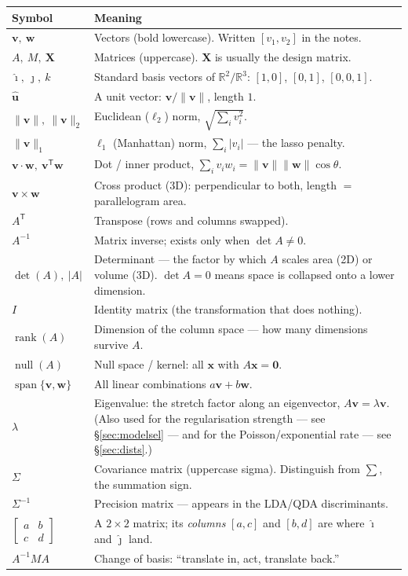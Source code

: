 \documentclass[10pt,letterpaper,onecolumn]{article}
\makeatletter
\newenvironment{symtab}
  {\begin{longtable}{@{}>{\raggedright\arraybackslash}p{0.26\textwidth}%
                       >{\raggedright\arraybackslash}p{0.70\textwidth}@{}}
   \toprule
   \textbf{Symbol} & \textbf{Meaning} \\
   \midrule
   \endhead
   \bottomrule
   \endfoot}
  {\end{longtable}}
\newcommand{\T}{\mathsf{T}}
\makeatother
\begin{document}
\begin{symtab}
$\mathbf{v},\ \mathbf{w}$ & Vectors (bold lowercase). Written $[v_1, v_2]$ in the notes. \\
$A,\ M,\ \mathbf{X}$ & Matrices (uppercase). $\mathbf{X}$ is usually the design matrix. \\
$\hat{\imath},\ \hat{\jmath},\ \hat{k}$ & Standard basis vectors of $\mathbb{R}^2 / \mathbb{R}^3$: $[1,0]$, $[0,1]$, $[0,0,1]$. \\
$\hat{\mathbf{u}}$ & A unit vector: $\mathbf{v}/\|\mathbf{v}\|$, length $1$. \\
$\|\mathbf{v}\|,\ \|\mathbf{v}\|_2$ & Euclidean ($\ell_2$) norm, $\sqrt{\textstyle\sum_i v_i^2}$. \\
$\|\mathbf{v}\|_1$ & $\ell_1$ (Manhattan) norm, $\sum_i |v_i|$ — the lasso penalty. \\
$\mathbf{v}\cdot\mathbf{w},\ \mathbf{v}^{\T}\mathbf{w}$ & Dot / inner product, $\sum_i v_i w_i = \|\mathbf{v}\|\|\mathbf{w}\|\cos\theta$. \\
$\mathbf{v}\times\mathbf{w}$ & Cross product (3D): perpendicular to both, length $=$ parallelogram area. \\
$A^{\T}$ & Transpose (rows and columns swapped). \\
$A^{-1}$ & Matrix inverse; exists only when $\det A \ne 0$. \\
$\det(A),\ |A|$ & Determinant — the factor by which $A$ scales area (2D) or volume (3D). $\det A=0$ means space is collapsed onto a lower dimension. \\
$I$ & Identity matrix (the transformation that does nothing). \\
$\operatorname{rank}(A)$ & Dimension of the column space — how many dimensions survive $A$. \\
$\operatorname{null}(A)$ & Null space / kernel: all $\mathbf{x}$ with $A\mathbf{x}=\mathbf{0}$. \\
$\operatorname{span}\{\mathbf{v},\mathbf{w}\}$ & All linear combinations $a\mathbf{v}+b\mathbf{w}$. \\
$\lambda$ & Eigenvalue: the stretch factor along an eigenvector, $A\mathbf{v}=\lambda\mathbf{v}$. (Also used for the regularisation strength — see \S\ref{sec:modelsel} — and for the Poisson/exponential rate — see \S\ref{sec:dists}.) \\
$\Sigma$ & Covariance matrix (uppercase sigma). Distinguish from $\sum$, the summation sign. \\
$\Sigma^{-1}$ & Precision matrix — appears in the LDA/QDA discriminants. \\
$\begin{bmatrix}a & b\\ c & d\end{bmatrix}$ & A $2\times2$ matrix; its \emph{columns} $[a,c]$ and $[b,d]$ are where $\hat{\imath}$ and $\hat{\jmath}$ land. \\
$A^{-1}MA$ & Change of basis: ``translate in, act, translate back.'' \\
\end{symtab}
\end{document}
